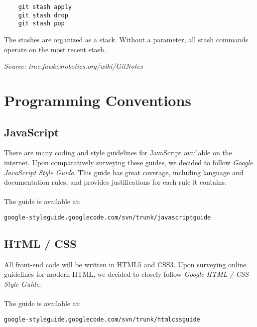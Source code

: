 \documentclass[twoside,12pt,a4paper]{article}
\begin{document}
\begin{lstlisting}
	git stash apply
	git stash drop
	git stash pop
\end{lstlisting}
\vspace*{0.25cm}

The stashes are organized as a stack. Without a parameter, all stash commands operate on the most recent stash.


\begin{flushright} \emph{Source: trac.fawkesrobotics.org/wiki/GitNotes} \end{flushright}

\section{Programming Conventions} %
\label{sec:programming_guidelines}

\subsection{JavaScript} %
\label{sub:javascript}

There are many coding and style guidelines for JavaScript available on the internet. Upon comparatively surveying these guides, we decided to follow \textit{Google JavaScript Style Guide}. This guide has great coverage, including language and documentation rules, and provides justifications for each rule it contains.  \\
\\
The guide is available at:
\begin{lstlisting} 	 
google-styleguide.googlecode.com/svn/trunk/javascriptguide
\end{lstlisting}

\subsection{HTML / CSS} %
\label{sub:htmlcss}

All front-end code will be written in HTML5 and CSS3. Upon surveying online guidelines for modern HTML, we decided to closely follow \textit{Google HTML / CSS Style Guide}. \\
\\
The guide is available at:
\begin{lstlisting} 	 
google-styleguide.googlecode.com/svn/trunk/htmlcssguide
\end{lstlisting}

\newpage
\end{document}
